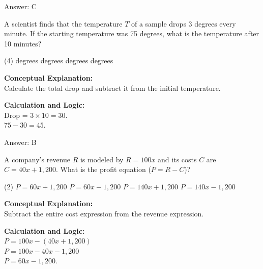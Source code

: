 \documentclass[11pt,paper=a4,answers]{exam}
\begin{document}
\begin{questions}
\begin{solution}
\vspace{15pt}
Answer: \colorbox{yellow!100}{C}
\end{solution}

\vspace{20pt}

\question
A scientist finds that the temperature $T$ of a sample drops 3 degrees every minute. If the starting temperature was 75 degrees, what is the temperature after 10 minutes?
\begin{tasks}(4)
     degrees
     degrees
     degrees
     degrees
\end{tasks}

\begin{solution}
\textbf{Conceptual Explanation:} \\
Calculate the total drop and subtract it from the initial temperature.

\vspace{10pt}
\textbf{Calculation and Logic:} \\
Drop = $3 \times 10 = 30$. \\
$75 - 30 = 45$.

\vspace{15pt}
Answer: \colorbox{yellow!100}{B}
\end{solution}

\vspace{20pt}

\question
A company's revenue $R$ is modeled by $R = 100x$ and its costs $C$ are $C = 40x + 1,200$. What is the profit equation ($P = R - C$)?
\begin{tasks}(2)
    \task $P = 60x + 1,200$
    \task $P = 60x - 1,200$
    \task $P = 140x + 1,200$
    \task $P = 140x - 1,200$
\end{tasks}

\begin{solution}
\textbf{Conceptual Explanation:} \\
Subtract the entire cost expression from the revenue expression.

\vspace{10pt}
\textbf{Calculation and Logic:} \\
$P = 100x - (40x + 1,200)$ \\
$P = 100x - 40x - 1,200$ \\
$P = 60x - 1,200$.


\end{solution}
\end{questions}
\end{document}
